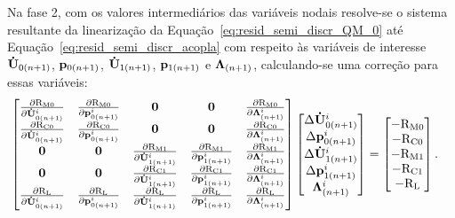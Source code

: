 Na fase 2, com os valores intermediários das variáveis nodais resolve-se o sistema resultante da linearização da Equação~\eqref{eq:resid_semi_discr_QM_0} até Equação~\eqref{eq:resid_semi_discr_acopla} com respeito às variáveis de interesse $\mathbf{\dot{U}}_{0(n+1)}$, $\mathbf{p}_{0(n+1)}$,  $\mathbf{\dot{U}}_{1(n+1)}$, $\mathbf{p}_{1(n+1)}$ e $\boldsymbol{\Lambda}_{(n+1)}$, calculando-se uma correção para essas variáveis:
\begin{align}
	\begin{bmatrix}
		\frac{\partial\mathrm{R}_\mathrm{M0}}{\partial\mathbf{\dot{U}}_{0(n+1)}^{i}} & \frac{\partial\mathrm{R}_\mathrm{M0}}{\partial\mathbf{p}_{0(n+1)}^{i}} & \mathbf{0} & \mathbf{0} & \frac{\partial\mathrm{R}_\mathrm{M0}}{\partial\boldsymbol{\Lambda}_{(n+1)}^{i}} \\
		\frac{\partial\mathrm{R}_\mathrm{C0}}{\partial\mathbf{\dot{U}}_{0(n+1)}^{i}} & \frac{\partial\mathrm{R}_\mathrm{C0}}{\partial\mathbf{p}_{0(n+1)}^{i}} & \mathbf{0} & \mathbf{0} & \frac{\partial\mathrm{R}_\mathrm{C0}}{\partial\boldsymbol{\Lambda}_{(n+1)}^{i}} \\
		\mathbf{0} & \mathbf{0} & \frac{\partial\mathrm{R}_\mathrm{M1}}{\partial\mathbf{\dot{U}}_{1(n+1)}^{i}} & \frac{\partial\mathrm{R}_\mathrm{M1}}{\partial\mathbf{p}_{1(n+1)}^{i}} & \frac{\partial\mathrm{R}_\mathrm{M1}}{\partial\boldsymbol{\Lambda}_{(n+1)}^{i}} \\
		\mathbf{0} & \mathbf{0} & \frac{\partial\mathrm{R}_\mathrm{C1}}{\partial\mathbf{\dot{U}}_{1(n+1)}^{i}} & \frac{\partial\mathrm{R}_\mathrm{C1}}{\partial\mathbf{p}_{1(n+1)}^{i}} & \frac{\partial\mathrm{R}_\mathrm{C1}}{\partial\boldsymbol{\Lambda}_{(n+1)}^{i}} \\
		\frac{\partial\mathrm{R}_\mathrm{L}}{\partial\mathbf{\dot{U}}_{0(n+1)}^{i}} & \frac{\partial\mathrm{R}_\mathrm{L}}{\partial\mathbf{p}_{0(n+1)}^{i}} & \frac{\partial\mathrm{R}_\mathrm{L}}{\partial\mathbf{\dot{U}}_{1(n+1)}^{i}} & \frac{\partial\mathrm{R}_\mathrm{L}}{\partial\mathbf{p}_{1(n+1)}^{i}} & \frac{\partial\mathrm{R}_\mathrm{L}}{\partial\boldsymbol{\Lambda}_{(n+1)}^{i}}
	\end{bmatrix}
	\begin{bmatrix}
		\Delta\mathbf{\dot{U}}_{0(n+1)}^{i} \\
		\Delta\mathbf{p}_{0(n+1)}^{i} \\
		\Delta\mathbf{\dot{U}}_{1(n+1)}^{i} \\
		\Delta\mathbf{p}_{1(n+1)}^{i} \\
		\boldsymbol{\Lambda}_{(n+1)}^{i}
	\end{bmatrix}
	&=
	\begin{bmatrix}
		-\mathrm{R}_\mathrm{M0} \\
		-\mathrm{R}_\mathrm{C0} \\
		-\mathrm{R}_\mathrm{M1} \\
		-\mathrm{R}_\mathrm{C1} \\
		-\mathrm{R}_\mathrm{L}
	\end{bmatrix}.
	\label{eq:sistema_linear_Arlq}
\end{align}	

